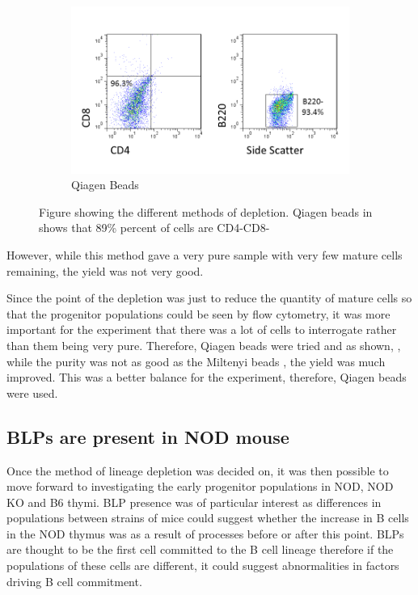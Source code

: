 \begin{figure}
\begin{subfigure}{0.8\textwidth}
	\includegraphics[width=\textwidth] {Figures/Qiagenbeads.png}
	\caption{Qiagen Beads}
	\label{subfig:Qiagen}
	\end{subfigure}
	
\caption{Figure showing the different methods of depletion. Qiagen beads in shows that 89\% percent of cells are CD4-CD8-}
\end{figure}
However, while this method gave a very pure sample with very few mature cells remaining, the yield was not very good.

Since the point of the depletion was just to reduce the quantity of mature cells so that the progenitor populations could be seen by flow cytometry, it was more important for the experiment that there was a lot of cells to interrogate rather than them being very pure.
Therefore, Qiagen beads were tried and as shown, , while the purity was not as good as the Miltenyi beads , the yield was much improved.
This was a better balance for the experiment, therefore, Qiagen beads were used.


\subsection{BLPs are present in NOD mouse}


Once the method of lineage depletion was decided on, it was then possible to move forward to investigating the early progenitor populations in NOD, NOD KO and B6 thymi.
BLP presence was of particular interest as differences in populations between strains of mice could suggest whether the increase in B cells in the NOD thymus was as a result of processes before or after this point.
BLPs are thought to be the first cell committed to the B cell lineage therefore if the populations of these cells are different, it could suggest abnormalities in factors driving B cell commitment.

